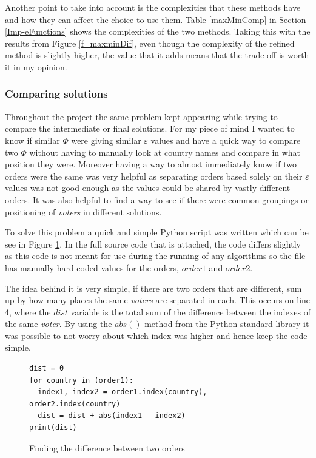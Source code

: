 \documentclass[12pt]{report}
\begin{document}
Another point to take into account is the complexities that these methods have and how they can affect the choice to use them. Table \ref{maxMinComp} in Section \ref{Imp-eFunctions} shows the complexities of the two methods. Taking this with the results from Figure \ref{f_maxminDif}, even though the complexity of the refined method is slightly higher, the value that it adds means that the trade-off is worth it in my opinion.

\subsubsection{Comparing solutions}
Throughout the project the same problem kept appearing while trying to compare the intermediate or final solutions. For my piece of mind I wanted to know if similar $\Phi$ were giving similar $\varepsilon$ values and have a quick way to compare two $\Phi$ without having to manually look at country names and compare in what position they were. Moreover having a way to almost immediately know if two orders were the same was very helpful as separating orders based solely on their $\varepsilon$ values was not good enough as the values could be shared by vastly different orders. It was also helpful to find a way to see if there were common groupings or positioning of \textit{voters} in different solutions.

To solve this problem a quick and simple Python script was written which can be see in Figure \ref{orderDiff}. In the full source code that is attached, the code differs slightly as this code is not meant for use during the running of any algorithms so the file has manually hard-coded values for the orders, $order1$ and $order2$.

The idea behind it is very simple, if there are two orders that are different, sum up by how many places the same \textit{voters} are separated in each. This occurs on line 4, where the $dist$ variable is the total sum of the difference between the indexes of the same \textit{voter}. By using the $abs()$ method from the Python standard library it was possible to not worry about which index was higher and hence keep the code simple.

\begin{figure}[H]
\caption{Finding the difference between two orders}
\label{orderDiff}
\begin{lstlisting}
dist = 0
for country in (order1):
  index1, index2 = order1.index(country), order2.index(country)
  dist = dist + abs(index1 - index2)
print(dist)
\end{lstlisting}
\end{figure}
\end{document}
